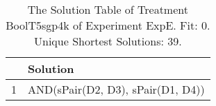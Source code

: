 \begin{table}[ht]
\centering
\begin{tabular}{rp{9cm}}
  \hline
 & Solution \\ 
  \hline
1 & AND(sPair(D2, D3), sPair(D1, D4)) \\ 
   \hline
\end{tabular}
\caption{The Solution Table of Treatment BoolT5sgp4k of Experiment ExpE. Fit: 0. Unique Shortest Solutions: 39.} 
\end{table}
